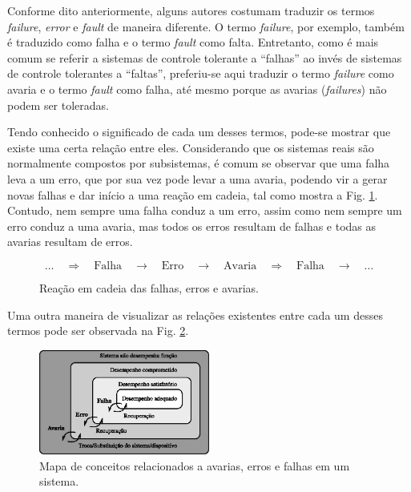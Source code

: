 Conforme dito anteriormente, alguns autores costumam traduzir os termos {\it
failure}, {\it error} e {\it fault} de maneira diferente. O termo {\it failure},
por exemplo, também é traduzido como falha e o termo {\it fault} como falta.
Entretanto, como é mais comum se referir a sistemas de controle tolerante a
``falhas'' ao invés de sistemas de controle tolerantes a ``faltas'', preferiu-se
aqui traduzir o termo {\it failure} como avaria e o termo {\it fault} como
falha, até mesmo porque as avarias ({\it failures}) não podem ser toleradas.

Tendo conhecido o significado de cada um desses termos, pode-se mostrar que
existe uma certa relação entre eles. Considerando que os sistemas reais são
normalmente compostos por subsistemas, é comum se observar que uma falha leva a
um erro, que por sua vez pode levar a uma avaria, podendo vir a gerar novas
falhas e dar início a uma reação em cadeia, tal como mostra a Fig.
\ref{fig:reacao_cadeia}. Contudo, nem sempre uma falha conduz a um erro, assim
como nem sempre um erro conduz a uma avaria, mas todos os erros resultam de
falhas e todas as avarias resultam de erros.

\begin{figure}[htb]
\centering
\[
\ldots
\quad\Longrightarrow\quad
\text{Falha} 
\quad\longrightarrow\quad
\text{Erro}
\quad\longrightarrow\quad
\text{Avaria}
\quad\Longrightarrow\quad
\text{Falha}
\quad\longrightarrow\quad
\ldots
\]
    \caption{Reação em cadeia das falhas, erros e avarias.}
    \label{fig:reacao_cadeia}
\end{figure}

Uma outra maneira de visualizar as relações existentes entre cada um desses
termos pode ser observada na Fig. \ref{fig:mapa_conceitos}.

\begin{figure}[htb]
\centering
    \includegraphics[width=0.5\textwidth]{imgs/detec_diag/eps/mapa_conceitos}
    \caption{Mapa de conceitos relacionados a avarias, erros e falhas em um
             sistema.}
    \label{fig:mapa_conceitos}
\end{figure}

